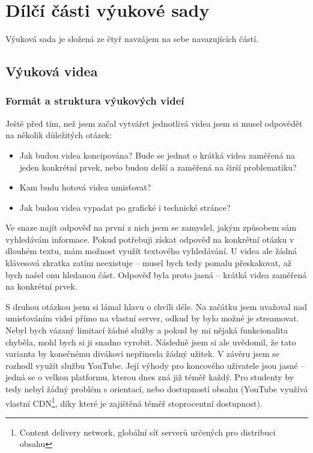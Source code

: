 \chapter{Dílčí části výukové sady}
Výuková sada je složená ze čtyř navzájem na sebe navazujících částí.


\section{Výuková videa}


\subsection{Formát a struktura výukových videí}
Ještě před tím, než jsem začal vytvářet jednotlivá videa jsem si musel odpovědět na několik důležitých otázek:
\begin{itemize}[topsep=0pt]
    \setlength\itemsep{0em}
    \item Jak budou videa koncipována? Bude se jednat o krátká videa zaměřená na jeden konkrétní prvek, nebo budou delší a zaměřená na širší problematiku?
    \item Kam budu hotová videa umisťovat?
    \item Jak budou videa vypadat po grafické i technické stránce?
\end{itemize}

Ve snaze najít odpověď na první z nich jsem se zamyslel, jakým způsobem sám vyhledávám informace.
Pokud potřebuji získat odpověď na konkrétní otázku v dlouhém textu, mám možnost využít textového vyhledávání. 
U videa ale žádná klávesová zkratka  zatím neexistuje -- musel bych tedy pomalu přeskakovat, až bych našel onu hledanou část.
Odpověď byla proto jasná -- krátká videa zaměřená na konkrétní prvek.

S druhou otázkou jsem si lámal hlavu o chvíli déle.
Na začátku jsem uvažoval nad umisťováním videí přímo na vlastní server, odkud by bylo možné je streamovat.
Nebyl bych vázaný limitací žádné služby a pokud by mi nějaká funkcionalita chyběla, mohl bych si ji snadno vyrobit.
Následně jsem si ale uvědomil, že tato varianta by konečnému divákovi nepřinesla žádný užitek.
V závěru jsem se rozhodl využít službu YouTube.
Její výhody pro koncového uživatele jsou jasné -- jedná se o velkou platformu, kterou dnes zná již téměř každý.
Pro studenty by tedy nebyl žádný problém s orientací, nebo dostupností obsahu (YouTube využívá vlastní CDN\footnote{Content delivery network, globální síť serverů určených pro distribuci obsahu}, díky které je zajištěná téměř stoprocentní dostupnost).

